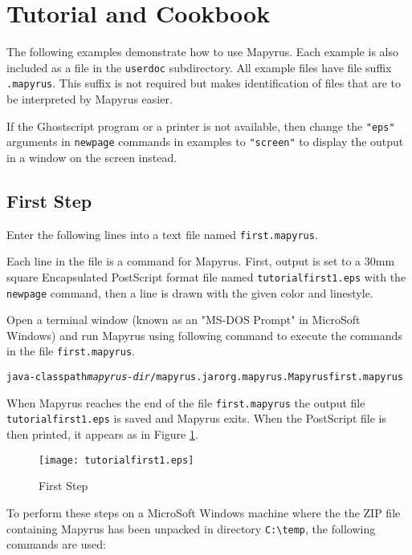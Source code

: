 
\section{Tutorial and Cookbook}

The following examples demonstrate how to use Mapyrus.  Each example is also
included as a file in the \texttt{userdoc} subdirectory.  All example files
have file suffix \texttt{.mapyrus}.  This suffix is not required but makes
identification of files that are to be interpreted by Mapyrus easier.

If the Ghostscript program or a printer is not available, then change the
\texttt{"eps"} arguments in \texttt{newpage} commands in examples to
\texttt{"screen"}
to display the output in a window on the screen instead.

\subsection{First Step}

Enter the following lines into a text file named \texttt{first.mapyrus}.



Each line in the file is a command for Mapyrus.  First, output is set to
a 30mm square Encapsulated PostScript format file named
\texttt{tutorialfirst1.eps} with the \texttt{newpage} command, then a
line is drawn with the given color and linestyle.

Open a terminal window (known as an "MS-DOS Prompt" in MicroSoft Windows)
and run Mapyrus using following command to execute the
commands in the file \texttt{first.mapyrus}.

\begin{alltt}
java -classpath \textit{mapyrus-dir}/mapyrus.jar org.mapyrus.Mapyrus first.mapyrus
\end{alltt}

When Mapyrus reaches the end of the file \texttt{first.mapyrus}
the output file \texttt{tutorialfirst1.eps} is saved and Mapyrus exits.
When the PostScript file is then printed, it appears as in
Figure \ref{tutorialfirst1}.

\begin{figure}[htb]
\texttt{[image: tutorialfirst1.eps]}
\caption{First Step}
\label{tutorialfirst1}
\end{figure}

To perform these steps on a MicroSoft Windows machine where the
the ZIP file containing Mapyrus has been unpacked in directory
\texttt{C:\textbackslash{}temp},
the following commands are used:

